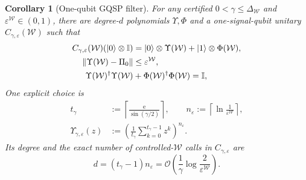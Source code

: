 \documentclass[10pt,conference]{IEEEtran}
\theoremstyle{plain}
\newtheorem{corollary}[theorem]{Corollary}
\theoremstyle{remark}
\begin{document}
\begin{corollary}[One-qubit GQSP filter]
\label{cor:w-spectral-filter}
For any certified \(0<\gamma\leq\Delta_{\mathcal W}\) and
\(\varepsilon^{\mathcal W}\in(0,1)\), there are
degree-\(d\) polynomials \(\Upsilon,\Phi\) and a one-signal-qubit
unitary \(C_{\gamma,\varepsilon}(\mathcal W)\) such that
\begin{align}
C_{\gamma,\varepsilon}(\mathcal W)(\ket0\otimes\mathbb I)
&=\ket0\otimes\Upsilon(\mathcal W)
 +\ket1\otimes\Phi(\mathcal W), \label{eq:gqsp-block-column}\\
\|\Upsilon(\mathcal W)-\Pi_0\|
&\leq\varepsilon^{\mathcal W}, \nonumber\\
\Upsilon(\mathcal W)^\dagger\Upsilon(\mathcal W)
&+\Phi(\mathcal W)^\dagger\Phi(\mathcal W)=\mathbb I ,
\label{eq:gqsp-filter-properties}
\end{align}
One explicit choice is
\begin{equation}
\label{eq:explicit-filter}
\begin{split}
t_\gamma&:=\left\lceil
\frac{\mathrm e}{\sin(\gamma/2)}\right\rceil,\qquad
n_\varepsilon:=\left\lceil
\ln\frac{1}{\varepsilon^{\mathcal W}}\right\rceil,\\
\Upsilon_{\gamma,\varepsilon}(z)
&:=
\left(\frac{1}{t_\gamma}
\sum_{k=0}^{t_\gamma-1}z^k\right)^{n_\varepsilon}.
\end{split}
\end{equation}
Its degree and the exact number of controlled-\(\mathcal W\) calls
in \(C_{\gamma,\varepsilon}\) are
\begin{equation}
\label{eq:explicit-filter-degree}
d=(t_\gamma-1)n_\varepsilon
=\mathcal O\!\left(
\frac{1}{\gamma}\log\frac{2}{\varepsilon^{\mathcal W}}\right).
\end{equation}
\end{corollary}
\end{document}
